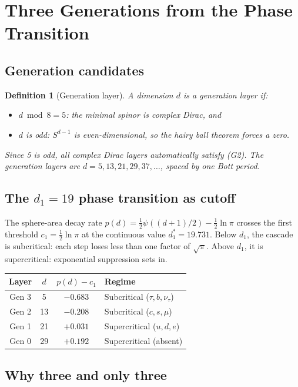 \documentclass[12pt,a4paper]{article}
\newtheorem{definition}[theorem]{Definition}
\begin{document}
\section{Three Generations from the Phase Transition}

\subsection{Generation candidates}

\begin{definition}[Generation layer]
A dimension $d$ is a generation layer if:
\begin{itemize}
\item[(G1)] $d\bmod 8=5$: the minimal spinor is complex Dirac, and
\item[(G2)] $d$ is odd: $S^{d-1}$ is even-dimensional, so the hairy ball theorem forces
a zero.
\end{itemize}
Since 5 is odd, all complex Dirac layers automatically satisfy (G2). The generation layers
are $d=5,13,21,29,37,\ldots$, spaced by one Bott period.
\end{definition}

\subsection{The $d_1=19$ phase transition as cutoff}

The sphere-area decay rate $p(d)=\tfrac{1}{2}\psi((d+1)/2)-\tfrac{1}{2}\ln\pi$ crosses
the first threshold $c_1=\tfrac{1}{2}\ln\pi$ at the continuous value $d^*_1=19.731$.
Below $d_1$, the cascade is subcritical: each step loses less than one factor of $\sqrt{\pi}$.
Above $d_1$, it is supercritical: exponential suppression sets in.

\begin{center}
\begin{tabular}{cccl}
\toprule
Layer & $d$ & $p(d)-c_1$ & Regime \\
\midrule
Gen 3 & 5  & $-0.683$ & Subcritical ($\tau,b,\nu_\tau$) \\
Gen 2 & 13 & $-0.208$ & Subcritical ($c,s,\mu$) \\
Gen 1 & 21 & $+0.031$ & Supercritical ($u,d,e$) \\
Gen 0 & 29 & $+0.192$ & Supercritical (absent) \\
\bottomrule
\end{tabular}
\end{center}

\subsection{Why three and only three}
\end{document}
